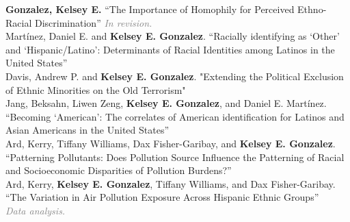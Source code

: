 

\years{} \textbf{Gonzalez, Kelsey E.} “The Importance of Homophily for Perceived Ethno-Racial Discrimination”
\textcolor{gray}{\emph{In revision.}} \\

 Martínez, Daniel E. and \textbf{Kelsey E. Gonzalez}. “Racially identifying as ‘Other’ and ‘Hispanic/Latino’: Determinants of Racial Identities among Latinos in the United States” \\ 

 Davis, Andrew P. and \textbf{Kelsey E. Gonzalez}. "Extending the Political Exclusion of Ethnic Minorities on the Old Terrorism" \\ 

Jang, Beksahn, Liwen Zeng, \textbf{Kelsey E. Gonzalez}, and Daniel E. Martínez. “Becoming ‘American’: The correlates of American identification for Latinos and Asian Americans in the United States”\\ 

 Ard, Kerry, Tiffany Williams, Dax Fisher-Garibay, and \textbf{Kelsey E. Gonzalez}. “Patterning Pollutants: Does Pollution Source Influence the Patterning of Racial and Socioeconomic Disparities of Pollution Burdens?”\\

 Ard, Kerry, \textbf{Kelsey E. Gonzalez}, Tiffany Williams, and Dax Fisher-Garibay. “The Variation in Air Pollution Exposure Across Hispanic Ethnic Groups” \\ 
\textcolor{gray}{\emph{Data analysis.}} 
